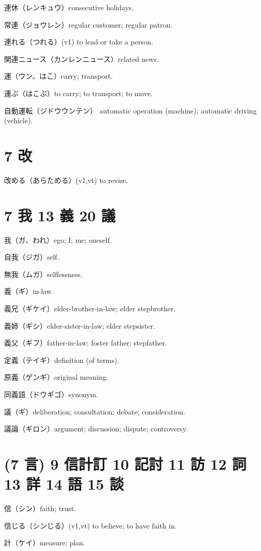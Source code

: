連休（レンキュウ）consecutive holidays.

常連（ジョウレン）regular customer; regular patron.

連れる（つれる）(v1) to lead or take a person.

関連ニュース（カンレンニュース）related news.

運（ウン、はこ）carry; transport.

運ぶ（はこぶ）to carry; to transport; to move.

自動運転（ジドウウンテン）
automatic operation (machine); automatic driving (vehicle).

\section{7 改}

改める（あらためる）(v1,vt) to revise.

\section{7 我 13 義 20 議}

我（ガ、われ）ego; I; me; oneself.

自我（ジガ）self.

無我（ムガ）selflessness.

義（ギ）in-law.

義兄（ギケイ）elder-brother-in-law; elder stepbrother.

義姉（ギシ）elder-sister-in-law; elder stepsister.

義父（ギフ）father-in-law; foster father; stepfather.

定義（テイギ）definition (of terms).

原義（ゲンギ）original meaning.

同義語（ドウギゴ）synonym.

議（ギ）deliberation; consultation; debate; consideration.

議論（ギロン）argument; discussion; dispute; controversy.

\section{(7 言) 9 信計訂 10 記討 11 訪 12 詞 13 詳 14 語 15 談}

信（シン）faith; trust.

信じる（シンじる）(v1,vt) to believe; to have faith in.

計（ケイ）measure; plan.

